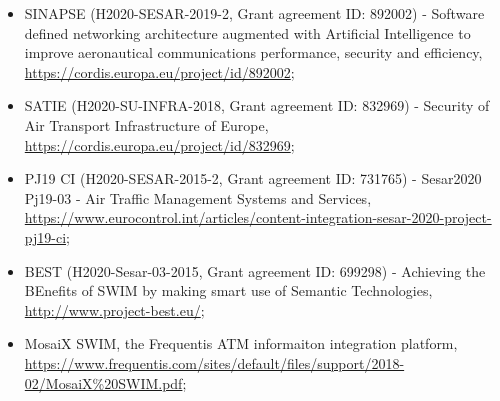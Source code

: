 \documentclass[a4paper,11pt]{article}
\begin{document}
\begin{itemize}

\item SINAPSE (H2020-SESAR-2019-2, Grant agreement ID: 892002) - Software defined networking architecture augmented with Artificial Intelligence to improve aeronautical communications performance, security and efficiency, \url{https://cordis.europa.eu/project/id/892002};

\item SATIE (H2020-SU-INFRA-2018, Grant agreement ID: 832969) - Security of Air Transport Infrastructure of Europe, \url{https://cordis.europa.eu/project/id/832969};


\item PJ19 CI (H2020-SESAR-2015-2, Grant agreement ID: 731765) - Sesar2020 Pj19-03 - Air Traffic Management Systems and Services, \url{https://www.eurocontrol.int/articles/content-integration-sesar-2020-project-pj19-ci};

\item BEST (H2020-Sesar-03-2015, Grant agreement ID: 699298) - Achieving the BEnefits of SWIM by making smart use of Semantic Technologies, \url{http://www.project-best.eu/};




\item MosaiX SWIM, the Frequentis ATM informaiton integration platform, \url{https://www.frequentis.com/sites/default/files/support/2018-02/MosaiX\%20SWIM.pdf}; 

\end{itemize}

\pagebreak
{}
\end{document}
